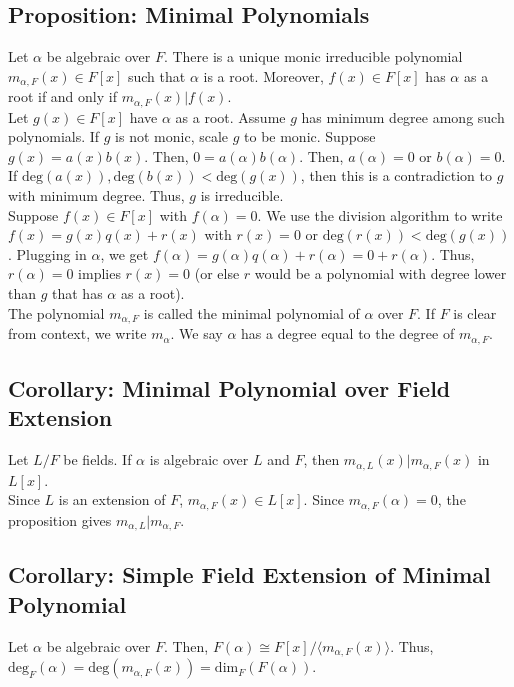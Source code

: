 \documentclass[10pt]{extarticle}
\begin{document}
  \subsection{Proposition: Minimal Polynomials}%
  Let $\alpha$ be algebraic over $F$. There is a unique monic irreducible polynomial $m_{\alpha,F}(x) \in F[x]$ such that $\alpha$ is a root. Moreover, $f(x) \in F[x]$ has $\alpha$ as a root if and only if $m_{\alpha,F}(x)|f(x)$.\\

  Let $g(x) \in F[x]$ have $\alpha$ as a root. Assume $g$ has minimum degree among such polynomials. If $g$ is not monic, scale $g$ to be monic. Suppose $g(x) = a(x)b(x)$. Then, $0 = a(\alpha)b(\alpha)$. Then, $a(\alpha) = 0$ or $b(\alpha) = 0$. If $\text{deg}(a(x)),\text{deg}(b(x)) < \text{deg}(g(x))$, then this is a contradiction to $g$ with minimum degree. Thus, $g$ is irreducible.\\

  Suppose $f(x) \in F[x]$ with $f(\alpha) = 0$. We use the division algorithm to write $f(x) = g(x)q(x) + r(x)$ with $r(x) = 0$ or $\text{deg}(r(x)) < \text{deg}(g(x))$. Plugging in $\alpha$, we get $f(\alpha) = g(\alpha)q(\alpha) + r(\alpha) = 0 + r(\alpha)$. Thus, $r(\alpha) = 0$ implies $r(x) = 0$ (or else $r$ would be a polynomial with degree lower than $g$ that has $\alpha$ as a root).\\
  
  The polynomial $m_{\alpha,F}$ is called the minimal polynomial of $\alpha$ over $F$. If $F$ is clear from context, we write $m_{\alpha}$. We say $\alpha$ has a degree equal to the degree of $m_{\alpha,F}$.
  \subsection{Corollary: Minimal Polynomial over Field Extension}%
  Let $L/F$ be fields. If $\alpha$ is algebraic over $L$ and $F$, then $m_{\alpha,L}(x)|m_{\alpha,F}(x)$ in $L[x]$.\\

  Since $L$ is an extension of $F$, $m_{\alpha,F}(x) \in L[x]$. Since $m_{\alpha,F}(\alpha) = 0$, the proposition gives $m_{\alpha,L}|m_{\alpha,F}$.
  \subsection{Corollary: Simple Field Extension of Minimal Polynomial}%
  Let $\alpha$ be algebraic over $F$. Then, $F(\alpha) \cong F[x]/\langle m_{\alpha,F}(x)\rangle$. Thus, $\text{deg}_{F}(\alpha) = \text{deg}(m_{\alpha,F}(x)) = \text{dim}_{F}(F(\alpha))$.
\end{document}
